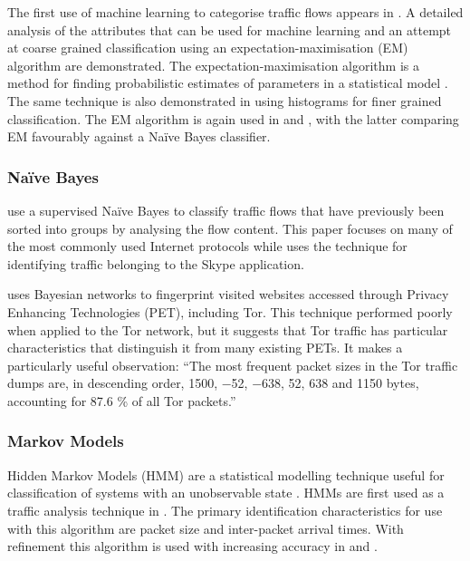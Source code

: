\documentclass{ecuthesis}
\begin{document}
The first use of machine learning to categorise traffic flows appears in
\textcite{McGregor:2004p3826}. A detailed analysis of the attributes that can
be used for machine learning and an attempt at coarse grained classification
using an expectation-maximisation (EM) algorithm are demonstrated. The
expectation-maximisation algorithm is a method for finding probabilistic
estimates of parameters in a statistical model \parencite{UW:2010p7083}. The
same technique is also demonstrated in \textcite{Soule:2004p3817} using
histograms for finer grained classification.  The EM algorithm is again used in
\textcite{Zander:2005p6212} and \textcite{Erman:2006p3825}, with the latter
comparing EM favourably against a Na\"{i}ve Bayes classifier.

\subsubsection{Na\"{i}ve Bayes}

\textcite{Moore:2005p3827} use a supervised Na\"{i}ve Bayes to classify traffic
flows that have previously been sorted into groups by analysing the flow
content. This paper focuses on many of the most commonly used Internet
protocols while \textcite{Bonfiglio:2007p6453} uses the technique for
identifying traffic belonging to the Skype application.

\textcite{Herrmann:2009p1189} uses Bayesian networks to fingerprint visited
websites accessed through Privacy Enhancing Technologies (PET), including Tor.
This technique performed poorly when applied to the Tor network, but it
suggests that Tor traffic has particular characteristics that distinguish it
from many existing PETs. It makes a particularly useful observation: ``The most
frequent packet sizes in the Tor traffic dumps are, in descending order, 1500,
−52, −638, 52, 638 and 1150 bytes, accounting for 87.6 \% of all Tor packets.''

\subsubsection{Markov Models}

Hidden Markov Models (HMM) are a statistical modelling technique useful
for classification of systems with an unobservable state
\parencite{Rabiner:1990p1153}. HMMs are first used as a traffic analysis
technique in  \parencite{Wright:2004p3860}. The
primary identification characteristics for use with this algorithm are packet
size and inter-packet arrival times. With refinement this algorithm is used
with increasing accuracy in \textcite{Wright:2006p322} and
\textcite{Dainotti:2008p1435}.
\end{document}
